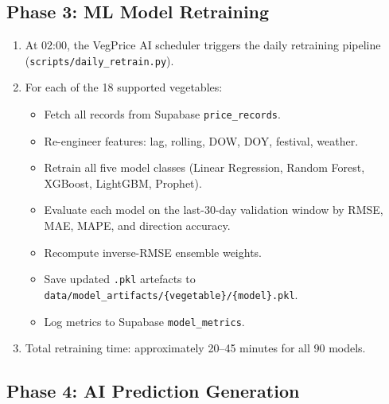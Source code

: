 \documentclass[12pt, a4paper, oneside]{report}
\begin{document}
\subsection{Phase 3: ML Model Retraining}

\begin{enumerate}
  \item At 02:00, the VegPrice AI scheduler triggers the daily retraining
        pipeline (\texttt{scripts/daily\_retrain.py}).
  \item For each of the 18 supported vegetables:
    \begin{itemize}
      \item Fetch all records from Supabase \texttt{price\_records}.
      \item Re-engineer features: lag, rolling, DOW, DOY, festival, weather.
      \item Retrain all five model classes (Linear Regression, Random Forest,
            XGBoost, LightGBM, Prophet).
      \item Evaluate each model on the last-30-day validation window
            by RMSE, MAE, MAPE, and direction accuracy.
      \item Recompute inverse-RMSE ensemble weights.
      \item Save updated \texttt{.pkl} artefacts to
            \texttt{data/model\_artifacts/\{vegetable\}/\{model\}.pkl}.
      \item Log metrics to Supabase \texttt{model\_metrics}.
    \end{itemize}
  \item Total retraining time: approximately 20--45 minutes for all 90 models.
\end{enumerate}

\subsection{Phase 4: AI Prediction Generation}
\end{document}
